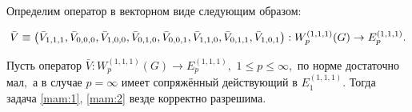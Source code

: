 Определим оператор в векторном виде следующим  образом:

\begin{equation*}

\bar{V} \equiv \left( \bar{V} _{1, 1, 1} ,\bar{V} _{0, 0, 0} ,\bar{V} _{1, 0, 0} ,%

\bar{V} _{0, 1, 0} ,\bar{V} _{0, 0, 1} ,\bar{V} _{1, 1, 0} ,\bar{V} _{0, 1, 1} ,\bar{%

V} _{1, 0, 1} \right) :W_{p} ^{(1, 1, 1) } ( G)

\to E_{p} ^{(1, 1, 1) }.

\end{equation*}





\begin{theorem}  Пусть оператор   $\bar{V} :W_{p} ^{(1, 1, 1) } ( G) \to E_{p}^{(1, 1, 1) },$ $1\leq p\leq \infty,$  по норме достаточно мал$,$ а в случае $p=\infty$  имеет сопряжённый действующий в  $E_1  ^{(1, 1, 1) }.$ Тогда задача {\rm \eqref{mam:1}, \eqref{mam:2}} везде корректно разрешима\rm.

\end{theorem}



\smallskip



